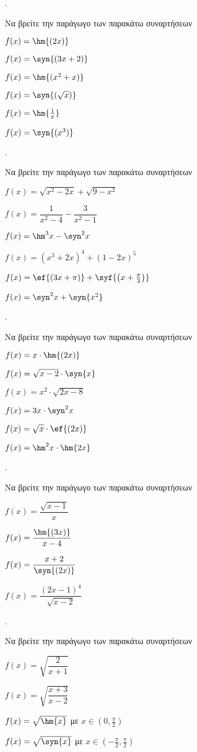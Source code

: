 \documentclass[11pt,a4paper,twocolumn]{article}
\newcounter{askhsh}
\newcommand{\askhsh}{\large\theaskhsh.\ \addtocounter{askhsh}{1}}
\begin{document}
\askhsh Να βρείτε την παράγωγο των παρακάτω συναρτήσεων
\begin{alist}
\item $ f(x)=\hm{(2x)} $
\item $ f(x)=\syn{(3x+2)} $
\item $ f(x)=\hm{(x^2+x)} $
\item $ f(x)=\syn{(\sqrt{x})} $
\item $ f(x)=\hm{\frac{1}{x}} $
\item $ f(x)=\syn{(x^3)} $
\end{alist}
\askhsh Να βρείτε την παράγωγο των παρακάτω συναρτήσεων
\begin{alist}
\item $ f(x)=\sqrt{x^2-2x}+\sqrt{9-x^2} $
\item $ f(x)=\dfrac{1}{x^2-4}-\dfrac{3}{x^2-1} $
\item $ f(x)=\hm^3{x}-\syn^2{x} $
\item $ f(x)=(x^3+2x)^4+(1-2x)^5 $
\item $ f(x)=\ef{\left(3x+\pi\right)}+\syf{\left(x+\frac{\pi}{3}\right)} $
\item $ f(x)=\syn^2{x}+\syn{x^2} $
\end{alist}
\askhsh Να βρείτε την παράγωγο των παρακάτω συναρτήσεων
\begin{alist}
\item $ f(x)=x\cdot\hm{(2x)} $
\item $ f(x)=\sqrt{x-2}\cdot\syn{x} $
\item $ f(x)=x^2\cdot\sqrt{2x-8} $
\item $ f(x)=3x\cdot\syn^2{x} $
\item $ f(x)=\sqrt{x}\cdot\ef{(2x)} $
\item $ f(x)=\hm^2{x}\cdot\hm{2x} $
\end{alist}
\askhsh Να βρείτε την παράγωγο των παρακάτω συναρτήσεων
\begin{multicols}{2}
\begin{alist}
\item $ f(x)=\dfrac{\sqrt{x-1}}{x} $
\item $ f(x)=\dfrac{\hm{(3x)}}{x-4} $
\item $ f(x)=\dfrac{x+2}{\syn{(2x)}} $
\item $ f(x)=\dfrac{(2x-1)^4}{\sqrt{x-2}} $
\end{alist}
\end{multicols}
\askhsh Να βρείτε την παράγωγο των παρακάτω συναρτήσεων
\begin{alist}
\item $ f(x)=\sqrt{\dfrac{2}{x+1}} $
\item $ f(x)=\sqrt{\dfrac{x+3}{x-2}} $
\item $ f(x)=\sqrt{\hm{x}} $ με $ x\in\left(0,\frac{\pi}{2}\right) $
\item $ f(x)=\sqrt{\syn{x}} $ με $ x\in\left(-\frac{\pi}{2},\frac{\pi}{2}\right) $
\end{alist}
\end{document}
